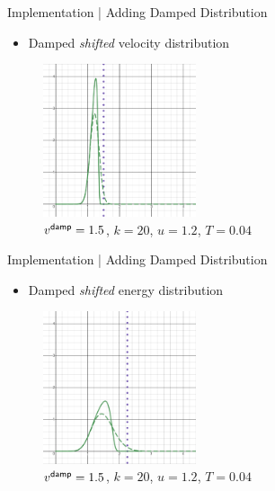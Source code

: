     \begin{frame}{Implementation | Adding Damped Distribution}
        \begin{itemize}
            \item  Damped \emph{shifted} velocity distribution
        \end{itemize}
        \begin{figure}
            \centering
            \includegraphics[width = 0.4\textwidth]{2 - implementation/2 - adding damped backgrounds/images/example shifted velocity distribution.png}
            \caption{$v^{\sf damp} = 1.5$, $k = 20$, $u = 1.2$, $T = 0.04$}
        \end{figure}
    \end{frame}
    
    \begin{frame}{Implementation | Adding Damped Distribution}
        \begin{itemize}
            \item  Damped \emph{shifted} energy distribution
        \end{itemize}
        \begin{figure}
            \centering
            \includegraphics[width = 0.4\textwidth]{2 - implementation/2 - adding damped backgrounds/images/example shifted energy distribution.png}
            \caption{$v^{\sf damp} = 1.5$, $k = 20$, $u = 1.2$, $T = 0.04$}
        \end{figure}
    \end{frame}
    
